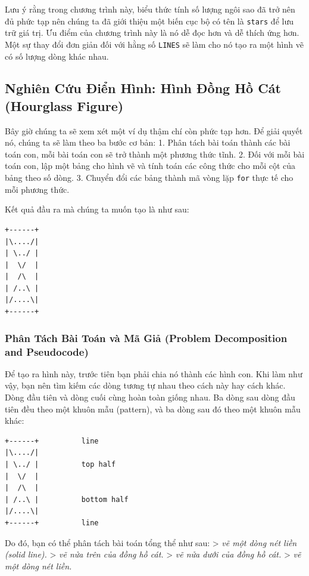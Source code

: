 Lưu ý rằng trong chương trình này, biểu thức tính số lượng ngôi sao đã
trở nên đủ phức tạp nên chúng ta đã giới thiệu một biến cục bộ có tên là
\texttt{stars} để lưu trữ giá trị. Ưu điểm của chương trình này là nó dễ
đọc hơn và dễ thích ứng hơn. Một sự thay đổi đơn giản đối với hằng số
\texttt{LINES} sẽ làm cho nó tạo ra một hình vẽ có số lượng dòng khác
nhau.

\subsection{Nghiên Cứu Điển Hình: Hình Đồng Hồ Cát (Hourglass
Figure)}\label{nghiuxean-cux1ee9u-ux111iux1ec3n-huxecnh-huxecnh-ux111ux1ed3ng-hux1ed3-cuxe1t-hourglass-figure}

Bây giờ chúng ta sẽ xem xét một ví dụ thậm chí còn phức tạp hơn. Để giải
quyết nó, chúng ta sẽ làm theo ba bước cơ bản: 1. Phân tách bài toán
thành các bài toán con, mỗi bài toán con sẽ trở thành một phương thức
tĩnh. 2. Đối với mỗi bài toán con, lập một bảng cho hình vẽ và tính toán
các công thức cho mỗi cột của bảng theo số dòng. 3. Chuyển đổi các bảng
thành mã vòng lặp \texttt{for} thực tế cho mỗi phương thức.

Kết quả đầu ra mà chúng ta muốn tạo là như sau:

\begin{verbatim}
+------+ 
|\..../| 
| \../ | 
|  \/  | 
|  /\  | 
| /..\ | 
|/....\| 
+------+
\end{verbatim}

\subsubsection{Phân Tách Bài Toán và Mã Giả (Problem Decomposition and
Pseudocode)}\label{phuxe2n-tuxe1ch-buxe0i-touxe1n-vuxe0-muxe3-giux1ea3-problem-decomposition-and-pseudocode}

Để tạo ra hình này, trước tiên bạn phải chia nó thành các hình con. Khi
làm như vậy, bạn nên tìm kiếm các dòng tương tự nhau theo cách này hay
cách khác. Dòng đầu tiên và dòng cuối cùng hoàn toàn giống nhau. Ba dòng
sau dòng đầu tiên đều theo một khuôn mẫu (pattern), và ba dòng sau đó
theo một khuôn mẫu khác:

\begin{verbatim}
+------+          line 
|\..../|
| \../ |          top half 
|  \/  |
|  /\  |
| /..\ |          bottom half 
|/....\|
+------+          line
\end{verbatim}

Do đó, bạn có thể phân tách bài toán tổng thể như sau: \textgreater{}
\emph{vẽ một dòng nét liền (solid line).} \textgreater{} \emph{vẽ nửa
trên của đồng hồ cát.} \textgreater{} \emph{vẽ nửa dưới của đồng hồ
cát.} \textgreater{} \emph{vẽ một dòng nét liền.}

